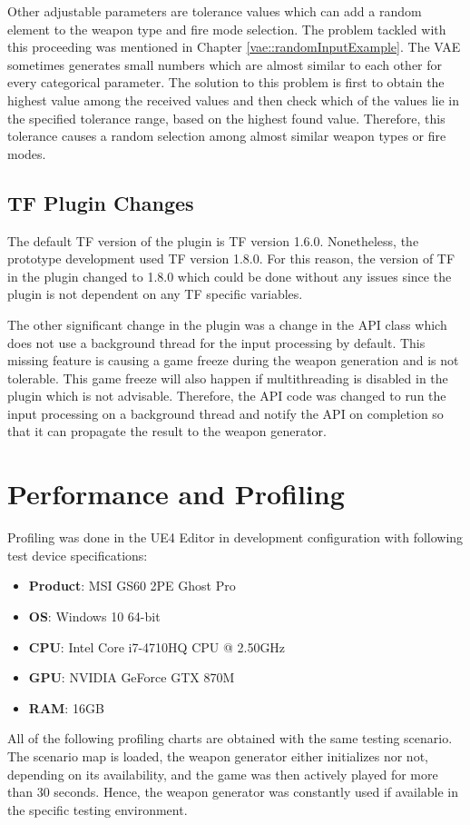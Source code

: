 \documentclass[MGS,Master,english]{twbook}%
\begin{document}
Other adjustable parameters are tolerance values which can add a random element to the weapon type and fire mode selection. The problem tackled with this proceeding was mentioned in Chapter \ref{vae::randomInputExample}. The VAE sometimes generates small numbers which are almost similar to each other for every categorical parameter. The solution to this problem is first to obtain the highest value among the received values and then check which of the values lie in the specified tolerance range, based on the highest found value. Therefore, this tolerance causes a random selection among almost similar weapon types or fire modes.

\subsection{\acl{TF} Plugin Changes}
The default TF version of the plugin is TF version 1.6.0. Nonetheless, the prototype development used TF version 1.8.0. For this reason, the version of TF in the plugin changed to 1.8.0 which could be done without any issues since the plugin is not dependent on any TF specific variables.

The other significant change in the plugin was a change in the API class which does not use a background thread for the input processing by default. This missing feature is causing a game freeze during the weapon generation and is not tolerable. This game freeze will also happen if multithreading is disabled in the plugin which is not advisable. Therefore, the API code was changed to run the input processing on a background thread and notify the API on completion so that it can propagate the result to the weapon generator.

\section{Performance and Profiling}
Profiling was done in the UE4 Editor in development configuration with following test device specifications:
\begin{itemize}
	\item \textbf{Product}: MSI GS60 2PE Ghost Pro
	\item \textbf{OS}: Windows 10 64-bit
	\item \textbf{CPU}: Intel Core i7-4710HQ CPU @ 2.50GHz
	\item \textbf{GPU}: NVIDIA GeForce GTX 870M
	\item \textbf{\ac{RAM}}: 16GB
\end{itemize}
All of the following profiling charts are obtained with the same testing scenario. The scenario map is loaded, the weapon generator either initializes nor not, depending on its availability, and the game was then actively played for more than 30 seconds. Hence, the weapon generator was constantly used if available in the specific testing environment. 
\end{document}
